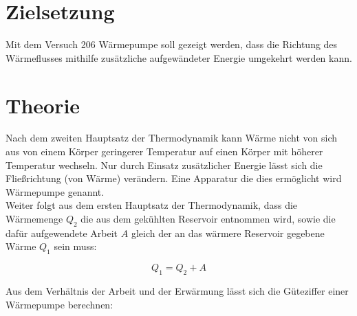 \section{Zielsetzung}
\label{sec:Zielsetzung}

Mit dem Versuch 206 Wärmepumpe soll gezeigt werden, dass die Richtung des Wärmeflusses mithilfe zusätzliche aufgewändeter
Energie umgekehrt werden kann.


\section{Theorie}
\label{sec:Theorie}
Nach dem zweiten Hauptsatz der Thermodynamik kann Wärme nicht von sich aus von einem Körper geringerer Temperatur auf einen Körper 
mit höherer Temperatur wechseln. Nur durch Einsatz zusätzlicher Energie lässt sich die Fließrichtung (von Wärme) verändern.
Eine Apparatur die dies ermöglicht wird Wärmepumpe genannt.\\
Weiter folgt aus dem ersten Hauptsatz der Thermodynamik, dass die Wärmemenge $Q_2$ die aus dem gekühlten Reservoir entnommen wird,
sowie die dafür aufgewendete Arbeit $A$ gleich der an das wärmere Reservoir gegebene Wärme $Q_1$ sein muss:

\begin{equation}\label{eqn:hauptsatz1}
    Q_1 = Q_2 + A
\end{equation}

Aus dem Verhältnis der Arbeit und der Erwärmung lässt sich die Güteziffer einer Wärmepumpe berechnen:

